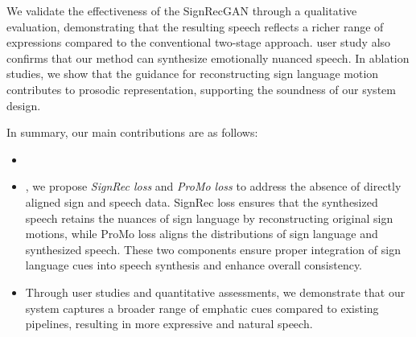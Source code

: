 
We validate the effectiveness of the SignRecGAN through a qualitative evaluation, 
demonstrating that the resulting speech reflects 
a richer range of expressions compared to the conventional two-stage approach.
 user study also confirms that our method can synthesize emotionally nuanced speech. 
In ablation studies, we show that the guidance for reconstructing sign language motion 
contributes to prosodic representation, supporting the soundness of our system design.

In summary, our main contributions are as follows:
\begin{itemize}
\item {}
\item {}, we propose \emph{SignRec loss} and \emph{ProMo loss} to address the absence of directly aligned sign and speech data.
SignRec loss ensures that the synthesized speech retains the nuances of sign language by reconstructing original sign motions,
while ProMo loss aligns the distributions of sign language and synthesized speech.
These two components ensure proper integration of sign language cues into speech synthesis and enhance overall consistency.
\item Through user studies and quantitative assessments, we demonstrate that our system captures a broader range of emphatic cues compared to existing pipelines, resulting in more expressive and natural speech.
\end{itemize}

